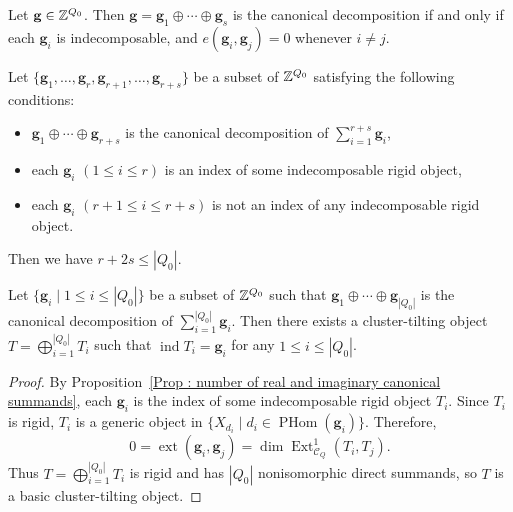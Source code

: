 \begin{Thm}[{\cite[Theorem 4.4]{DF15}}]
\label{Thm : characterization of canonical decompositions}
Let $\mathbf{g} \in \mathbb{Z}^{Q_0}$.
Then $\mathbf{g} = \mathbf{g}_1 \oplus \cdots \oplus \mathbf{g}_s$
is the canonical decomposition
if and only if each $\mathbf{g}_i$ is indecomposable, and
$e(\mathbf{g}_i, \mathbf{g}_j) = 0$ whenever $i \neq j$.
\end{Thm}

\begin{Prop}[{\cite[Corollary 21]{DW02}}]
\label{Prop : number of real and imaginary canonical summands}
Let $\{\mathbf{g}_1, \ldots, \mathbf{g}_r,
\mathbf{g}_{r+1}, \ldots, \mathbf{g}_{r+s}\}$ be a subset
of $\mathbb{Z}^{Q_0}$ satisfying the following conditions:
\begin{itemize}
    \item
    $\mathbf{g}_1 \oplus \cdots \oplus \mathbf{g}_{r+s}$
    is the canonical decomposition
    of $\sum_{i=1}^{r+s}\mathbf{g}_i$,
    \item
    each $\mathbf{g}_i$ $(1 \leq i \leq r)$ is an index of some
    indecomposable rigid object,
    \item
    each $\mathbf{g}_i$ $(r+1 \leq i \leq r+s)$ is not an index of any
    indecomposable rigid object.
\end{itemize}
Then we have $r + 2s \leq |Q_0|$.
\end{Prop}

\begin{Cor}
\label{Cor : full canonical decomposition and cluster tilting}
Let $\{\mathbf{g}_i \mid 1 \leq i \leq |Q_0|\}$ be a subset of $\mathbb{Z}^{Q_0}$
such that $\mathbf{g}_1 \oplus \cdots \oplus \mathbf{g}_{|Q_0|}$
is the canonical
decomposition of $\sum_{i=1}^{|Q_0|}\mathbf{g}_i$.
Then there exists a cluster-tilting object
$T = \bigoplus_{i=1}^{|Q_0|}T_i$ such that
$\operatorname{ind}T_i = \mathbf{g}_i$ for any $1 \leq i \leq |Q_0|$.
\end{Cor}

\begin{proof}
By Proposition~\ref{Prop : number of real and imaginary canonical summands},
each $\mathbf{g}_i$ is the index of some indecomposable rigid object $T_i$.
Since $T_i$ is rigid, $T_i$ is a generic object in
$\{X_{d_i} \mid d_i \in \operatorname{PHom}(\mathbf{g}_i)\}$.
Therefore,
\[
0 = \operatorname{ext}(\mathbf{g}_i, \mathbf{g}_j)
= \dim\operatorname{Ext}^1_{\mathcal{C}_Q}(T_i, T_j).
\]
Thus $T = \bigoplus_{i=1}^{|Q_0|}T_i$ is rigid and has $|Q_0|$
nonisomorphic direct summands, so $T$ is a basic cluster-tilting object.
\end{proof}

